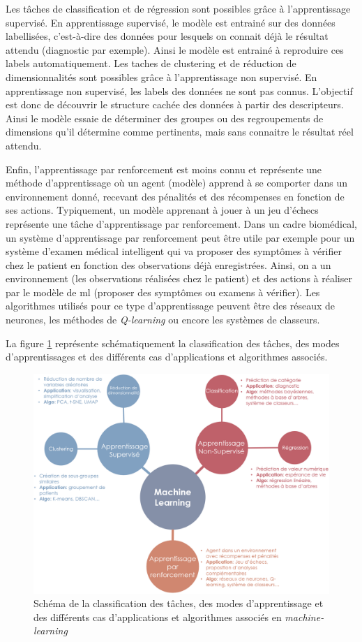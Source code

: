 Les tâches de classification et de régression sont possibles grâce à l'apprentissage supervisé. En apprentissage supervisé, le modèle est entrainé sur des données labellisées, c'est-à-dire des données pour lesquels on connait déjà le résultat attendu (diagnostic par exemple). Ainsi le modèle est entrainé à reproduire ces labels automatiquement.
Les taches de clustering et de réduction de dimensionnalités sont possibles grâce à l'apprentissage non supervisé. En apprentissage non supervisé, les labels des données ne sont pas connus. L'objectif est donc de découvrir le structure cachée des données à partir des descripteurs. Ainsi le modèle essaie de déterminer des groupes ou des regroupements de dimensions qu'il détermine comme pertinents, mais sans connaitre le résultat réel attendu.

Enfin, l'apprentissage par renforcement est moins connu et représente une méthode d'apprentissage où un agent (modèle) apprend à se comporter dans un environnement donné, recevant des pénalités et des récompenses en fonction de ses actions. Typiquement,  un modèle apprenant à jouer à un jeu d'échecs représente une tâche d'apprentissage par renforcement. Dans un cadre biomédical, un système d'apprentissage par renforcement peut être utile par exemple pour un système d'examen médical intelligent qui va proposer des symptômes à vérifier chez le patient en fonction des observations déjà enregistrées. Ainsi, on a un environnement (les observations réalisées chez le patient) et des actions à réaliser par le modèle de \gls{ml} (proposer des symptômes ou examens à vérifier). Les algorithmes utilisés pour ce type d'apprentissage peuvent être des réseaux de neurones, les méthodes de \textit{Q-learning} ou encore les systèmes de classeurs.

La figure \ref{fig:ml-landscape} représente schématiquement la classification des tâches, des modes d'apprentissages et des différents cas d'applications et algorithmes associés.
\begin{figure}[!htbp]
 \centering
 \includegraphics[width=1\textwidth]{figures/ml_landscape.png}
 \caption[Schéma des méthodes de machine-learning]{Schéma de la classification des tâches, des modes d'apprentissage et des différents cas d'applications et algorithmes associés en \textit{machine-learning}}
 \label{fig:ml-landscape}
\end{figure}

